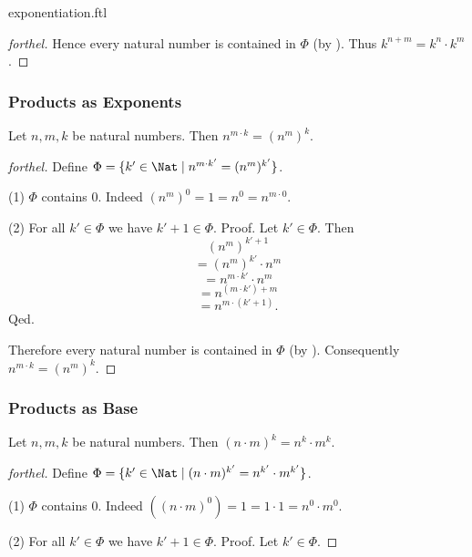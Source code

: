 \documentclass{naproche-library}
\begin{document}
\begin{smodule}{exponentiation.ftl}
\begin{proof}[forthel]
    Hence every natural number is contained in $\Phi$ (by ).
    Thus $k^{n + m} = k^{n} \cdot k^{m}$.
  \end{proof}


  \subsubsection*{Products as Exponents}

  \begin{proposition}[forthel,id=ARITHMETIC_09_7827956571308032]
    Let $n, m, k$ be natural numbers.
    Then $n^{m \cdot k} = (n^{m})^{k}$.
  \end{proposition}
  \begin{proof}[forthel]
    Define $\Phi = \{ k' \in \Nat \mid n^{m \cdot k'} = (n^{m})^{k'} \}$.

    (1) $\Phi$ contains $0$.
    Indeed $(n^{m})^{0}
      = 1
      = n^{0}
      = n^{m \cdot 0}$.

    (2) For all $k' \in \Phi$ we have $k' + 1 \in \Phi$. \newline
    Proof.
      Let $k' \in \Phi$.
      Then
      \[  (n^{m})^{k' + 1}                \]
      \[    = (n^{m})^{k'} \cdot n^{m}    \]
      \[    = n^{m \cdot k'} \cdot n^{m}  \]
      \[    = n^{(m \cdot k') + m}        \]
      \[    = n^{m \cdot (k' + 1)}.       \]
    Qed.

    Therefore every natural number is contained in $\Phi$ (by ).
    Consequently $n^{m \cdot k} = (n^{m})^{k}$.
  \end{proof}


  \subsubsection*{Products as Base}

  \begin{proposition}[forthel,id=ARITHMETIC_09_2563032276271104]
    Let $n, m, k$ be natural numbers.
    Then $(n \cdot m)^{k} = n^{k} \cdot m^{k}$.
  \end{proposition}
  \begin{proof}[forthel]
    Define $\Phi = \{ k' \in \Nat \mid (n \cdot m)^{k'} = n^{k'} \cdot m^{k'} \}$.

    (1) $\Phi$ contains $0$.
    Indeed $((n \cdot m)^{0})
      = 1
      = 1 \cdot 1
      = n^{0} \cdot m^{0}$. %

    (2) For all $k' \in \Phi$ we have $k' + 1 \in \Phi$. \newline
    Proof.
      Let $k' \in \Phi$.


\end{proof}
\end{smodule}
\end{document}
